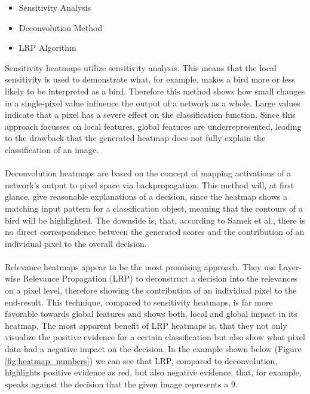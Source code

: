 \documentclass{acmsiggraph}               %
\begin{document}
\begin{itemize}
  \setlength\itemsep{0em}
  \item Sensitivity Analysis
  \item Deconvolution Method
  \item LRP Algorithm
\end{itemize}

Sensitivity heatmaps utilize sensitivity analysis. This means that the local sensitivity is used to demonstrate what, for example, makes a bird more or less likely to be interpreted as a bird. Therefore this method shows how small changes in a single-pixel value influence the output of a network as a whole. Large values indicate that a pixel has a severe effect on the classification function. Since this approach focusses on local features, global features are underrepresented, leading to the drawback that the generated heatmap does not fully explain the classification of an image.\\\\
Deconvolution heatmaps are based on the concept of mapping activations of a network's output to pixel space via backpropagation. This method will, at first glance, give reasonable explanations of a decision, since the heatmap shows a matching input pattern for a classification object, meaning that the contours of a bird will be highlighted. The downside is, that, according to Samek et al., there is no direct correspondence between the generated scores and the contribution of an individual pixel to the overall decision.\\\\
Relevance heatmaps appear to be the most promising approach. They use Layer-wise Relevance Propagation (LRP) to deconstruct a decision into the relevances on a pixel level, therefore showing the contribution of an individual pixel to the end-result. This technique, compared to sensitivity heatmaps, is far more favorable towards global features and shows both, local and global impact in its heatmap. The most apparent benefit of LRP heatmaps is, that they not only visualize the positive evidence for a certain classification but also show what pixel data had a negative impact on the decision. In the example shown below (Figure \ref{fig:heatmap_numbers}) we can see that LRP, compared to deconvolution, highlights positive evidence as red, but also negative evidence, that, for example, speaks against the decision that the given image represents a 9.
\end{document}
